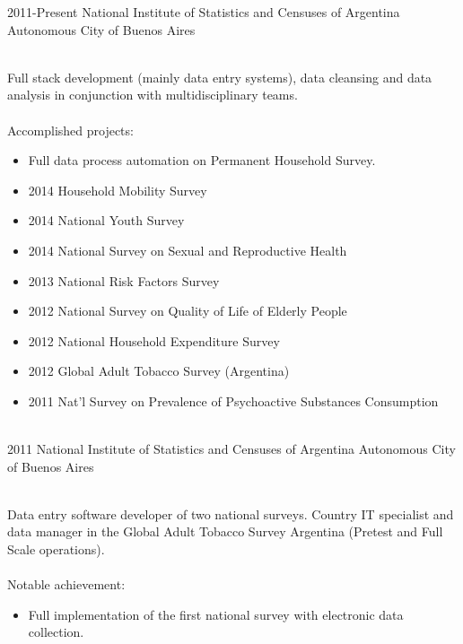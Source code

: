 \documentclass[]{cv-style}          %
\begin{document}
\begin{entrylist}
\entry
  {2011-Present}
  {National Institute of Statistics and Censuses of Argentina}
  {Autonomous City of Buenos Aires}
  {\\
  Full stack development (mainly data entry systems), data cleansing and data analysis in conjunction with multidisciplinary teams.\\\
  \\
  Accomplished projects:
  \begin{itemize}
  	\item Full data process automation on Permanent Household Survey.
  	\item 2014 Household Mobility Survey
    \item 2014 National Youth Survey
    \item 2014 National Survey on Sexual and Reproductive Health
    \item 2013 National Risk Factors Survey
    \item 2012 National Survey on Quality of Life of Elderly People
    \item 2012 National Household Expenditure Survey
    \item 2012 Global Adult Tobacco Survey (Argentina)
    \item 2011 Nat'l Survey on Prevalence of Psychoactive Substances Consumption 
  \end{itemize}
}\\
\entry
  {2011}
  {National Institute of Statistics and Censuses of Argentina}
  {Autonomous City of Buenos Aires}
  {\\
  Data entry software developer of two national surveys. Country IT specialist and data manager in the Global Adult Tobacco Survey Argentina (Pretest and Full Scale operations). \\\
  \\
  Notable achievement:
  \begin{itemize}
    \item Full implementation of the first national survey with electronic data collection.
  \end{itemize}
}\\

\end{entrylist}
\end{document}
